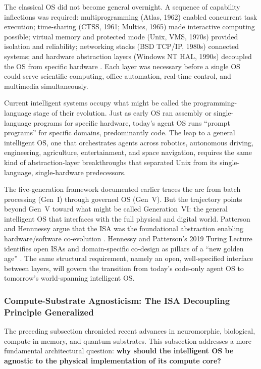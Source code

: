 The classical OS did not become general overnight. A sequence of capability inflections was required: multiprogramming (Atlas, 1962) enabled concurrent task execution; time-sharing (CTSS, 1961; Multics, 1965) made interactive computing possible; virtual memory and protected mode (Unix, VMS, 1970s) provided isolation and reliability; networking stacks (BSD TCP/IP, 1980s) connected systems; and hardware abstraction layers (Windows NT HAL, 1990s) decoupled the OS from specific hardware \cite{ritchie_thompson_1974, corbato_1962_ctss, corbato_1965_multics}. Each layer was necessary before a single OS could serve scientific computing, office automation, real-time control, and multimedia simultaneously.

Current intelligent systems occupy what might be called the programming-language stage of their evolution. Just as early OS ran assembly or single-language programs for specific hardware, today's agent OS runs ``prompt programs'' for specific domains, predominantly code. The leap to a general intelligent OS, one that orchestrates agents across robotics, autonomous driving, engineering, agriculture, entertainment, and space navigation, requires the same kind of abstraction-layer breakthroughs that separated Unix from its single-language, single-hardware predecessors.

The five-generation framework documented earlier traces the arc from batch processing (Gen~I) through governed OS (Gen~V). But the trajectory points beyond Gen~V toward what might be called Generation~VI: the general intelligent OS that interfaces with the full physical and digital world. Patterson and Hennnessy argue that the ISA was the foundational abstraction enabling hardware/software co-evolution \cite{patterson_hennessy_2017}. Hennessy and Patterson's 2019 Turing Lecture identifies open ISAs and domain-specific co-design as pillars of a ``new golden age'' \cite{hennessy_patterson_2019}. The same structural requirement, namely an open, well-specified interface between layers, will govern the transition from today's code-only agent OS to tomorrow's world-spanning intelligent OS.

\subsubsection{Compute-Substrate Agnosticism: The ISA Decoupling Principle Generalized}

The preceding subsection chronicled recent advances in neuromorphic, biological, compute-in-memory, and quantum substrates. This subsection addresses a more fundamental architectural question: \textbf{why should the intelligent OS be agnostic to the physical implementation of its compute core?}

